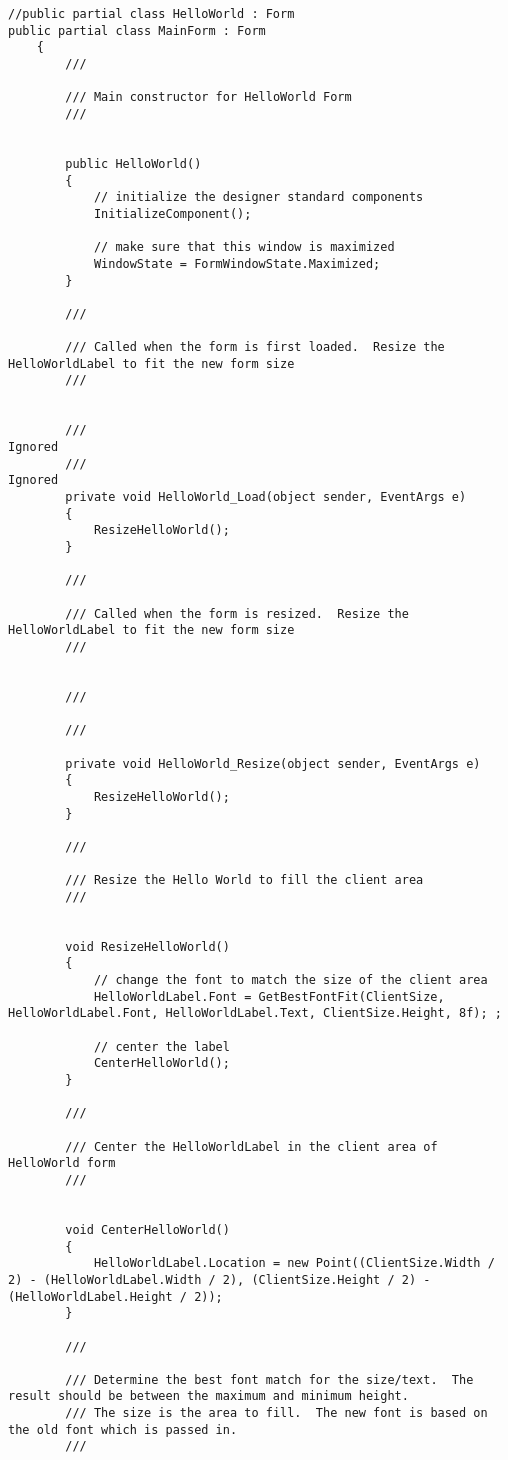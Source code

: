 \begin{Verbatim}
//public partial class HelloWorld : Form
public partial class MainForm : Form
    {
        ///

        /// Main constructor for HelloWorld Form
        /// 


        public HelloWorld()
        {
            // initialize the designer standard components
            InitializeComponent();

            // make sure that this window is maximized
            WindowState = FormWindowState.Maximized;
        }

        ///

        /// Called when the form is first loaded.  Resize the HelloWorldLabel to fit the new form size
        /// 


        ///
Ignored
        ///
Ignored
        private void HelloWorld_Load(object sender, EventArgs e)
        {
            ResizeHelloWorld();
        }

        ///

        /// Called when the form is resized.  Resize the HelloWorldLabel to fit the new form size
        /// 


        ///

        ///

        private void HelloWorld_Resize(object sender, EventArgs e)
        {
            ResizeHelloWorld();
        }

        ///

        /// Resize the Hello World to fill the client area
        /// 


        void ResizeHelloWorld()
        {
            // change the font to match the size of the client area
            HelloWorldLabel.Font = GetBestFontFit(ClientSize, HelloWorldLabel.Font, HelloWorldLabel.Text, ClientSize.Height, 8f); ;

            // center the label
            CenterHelloWorld();
        }

        ///

        /// Center the HelloWorldLabel in the client area of HelloWorld form
        /// 


        void CenterHelloWorld()
        {
            HelloWorldLabel.Location = new Point((ClientSize.Width / 2) - (HelloWorldLabel.Width / 2), (ClientSize.Height / 2) - (HelloWorldLabel.Height / 2));
        }

        ///

        /// Determine the best font match for the size/text.  The result should be between the maximum and minimum height.
        /// The size is the area to fill.  The new font is based on the old font which is passed in.
        /// 



\end{Verbatim}
